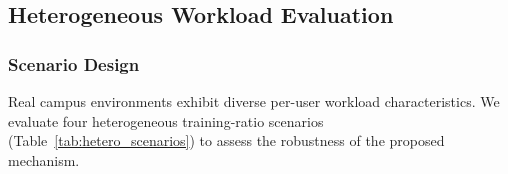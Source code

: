 %


\subsection{Heterogeneous Workload Evaluation}
\label{sec:hetero}


\subsubsection{Scenario Design}

Real campus environments exhibit diverse per-user workload characteristics.
We evaluate four heterogeneous training-ratio scenarios (Table~\ref{tab:hetero_scenarios})
to assess the robustness of the proposed mechanism.

%

